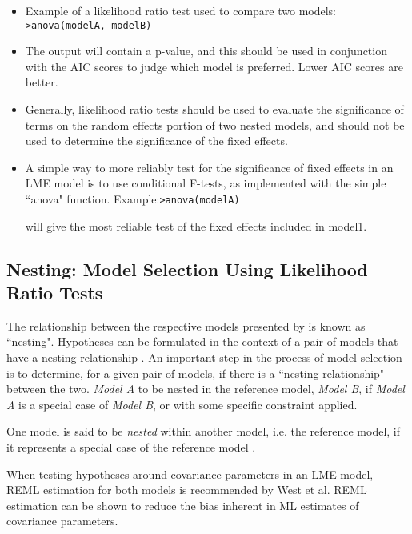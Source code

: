 \documentclass[12pt, a4paper]{report}
\theoremstyle{plain}
\theoremstyle{definition}
\theoremstyle{remark}
\begin{document}
	\begin{itemize}
		\item Example of a likelihood ratio test used to compare two models: \newline \texttt{>anova(modelA, modelB)}
		
		\item The output will contain a p-value, and this should be used in conjunction with the AIC scores to judge which model is preferred. Lower AIC scores are better.
		
		\item Generally, likelihood ratio tests should be used to evaluate the significance of terms on the
		random effects portion of two nested models, and should not be used to determine the significance of the fixed effects.
		\item A simple way to more reliably test for the significance of fixed effects in an LME model is to use
		conditional F-tests, as implemented with the simple ``anova" function.
		Example:\newline \texttt{>anova(modelA)}
		
		
		will give the most reliable test of the fixed effects included in model1.
	\end{itemize}
	
	\subsection{Nesting: Model Selection Using Likelihood Ratio Tests}
	The relationship between the respective models presented by \citet{ARoy2009} is known as ``nesting".
	Hypotheses can be formulated in the context of a pair of models that have a nesting relationship \citet{west}.
	An important step in the process of model selection is to determine, for a given pair of models, if there is a ``nesting relationship" between the two.
	\textit{Model A} to be nested in the reference model, \textit{Model B}, if \textit{Model A} is a special case
	of \textit{Model B}, or with some specific constraint applied.
	
	One model is said to be \emph{nested} within another model, i.e. the reference model, if it represents a special case of the reference model \citep{PB}.
	
	
	
	
	When testing hypotheses around covariance parameters in an LME model, REML estimation for both models is recommended by West et al. REML estimation can be shown to reduce the bias inherent in ML estimates of covariance parameters.
	
\end{document}
